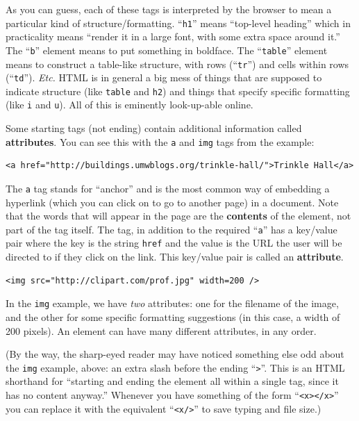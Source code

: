 As you can guess, each of these tags is interpreted by the browser to mean a
particular kind of structure/formatting. ``\texttt{h1}'' means ``top-level
heading'' which in practicality means ``render it in a large font, with some
extra space around it.'' The ``\texttt{b}'' element means to put something in
boldface. The ``\texttt{table}'' element means to construct a table-like
structure, with rows (``\texttt{tr}'') and cells within rows (``\texttt{td}'').
\textit{Etc.} HTML is in general a big mess of things that are supposed to
indicate structure (like \texttt{table} and \texttt{h2}) and things that
specify specific formatting (like \texttt{i} and \texttt{u}). All of this is
eminently look-up-able online.

\pagebreak
Some starting tags (not ending) contain additional information called
\textbf{attributes}. You can see this with the \texttt{a} and \texttt{img}
tags from the example:

\begin{Verbatim}[fontsize=\footnotesize,samepage=true,frame=lines]
<a href="http://buildings.umwblogs.org/trinkle-hall/">Trinkle Hall</a>
\end{Verbatim}

The \texttt{a} tag stands for ``anchor'' and is the most common way of
embedding a hyperlink (which you can click on to go to another page) in a
document. Note that the words that will appear in the page are the
\textbf{contents} of the element, not part of the tag itself. The tag, in
addition to the required ``\texttt{a}'' has a key/value pair where the key is
the string \texttt{href} and the value is the URL the user will be directed to
if they click on the link. This key/value pair is called an
\textbf{attribute}.

\begin{Verbatim}[fontsize=\footnotesize,samepage=true,frame=lines]
<img src="http://clipart.com/prof.jpg" width=200 />
\end{Verbatim}

In the \texttt{img} example, we have \textit{two} attributes: one for the
filename of the image, and the other for some specific formatting suggestions
(in this case, a width of 200 pixels). An element can have many different
attributes, in any order.

(By the way, the sharp-eyed reader may have noticed something else odd about
the \texttt{img} example, above: an extra slash before the ending
``\texttt{>}''. This is an HTML shorthand for ``starting and ending the element
all within a single tag, since it has no content anyway.'' Whenever you have
something of the form ``\texttt{<x></x>}'' you can replace it with the
equivalent ``\texttt{<x/>}'' to save typing and file size.)

